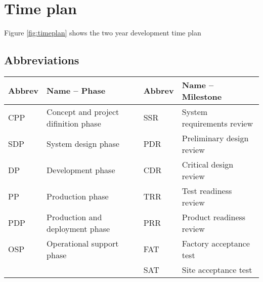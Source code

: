 \documentclass[Main]{subfiles}
\begin{document}
\chapter{Time plan}

Figure \ref{fig:timeplan} shows the two year development time plan



\section{Abbreviations}

\begin{tabular}{p{} p{} p{} p{}}
\hline
\textbf{Abbrev} & \textbf{Name -- Phase} &
\textbf{Abbrev} & \textbf{Name -- Milestone}
\\
\hline
CPP & Concept and project difinition phase &
SSR & System requirements review\\

SDP & System design phase &
PDR & Preliminary design review \\

DP & Development phase &
CDR & Critical design review\\

PP & Production phase &
TRR & Test readiness review \\

PDP & Production and deployment phase &
PRR & Product readiness review \\

OSP & Operational support phase &
FAT & Factory acceptance test \\

&& SAT & Site acceptance test \\
\hline

\end{tabular}
\end{document}
